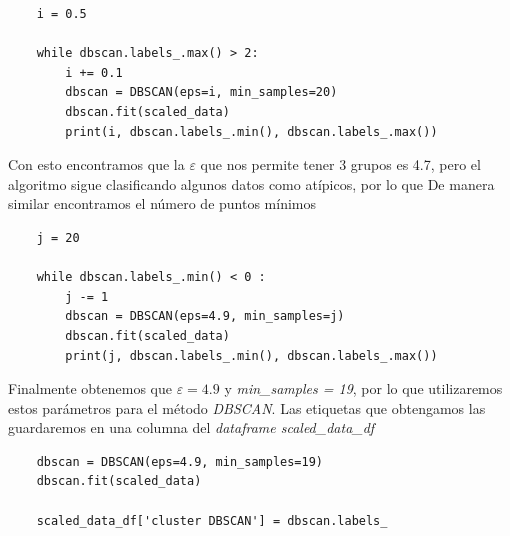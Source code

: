 \begin{lstlisting}
    i = 0.5
    
    while dbscan.labels_.max() > 2:
        i += 0.1
        dbscan = DBSCAN(eps=i, min_samples=20)
        dbscan.fit(scaled_data)
        print(i, dbscan.labels_.min(), dbscan.labels_.max())
\end{lstlisting}

Con esto encontramos que la $\varepsilon$ que nos permite tener 3 grupos es 4.7, pero el algoritmo sigue clasificando algunos datos como atípicos, por lo que De manera similar encontramos el número de puntos mínimos

\begin{lstlisting}
    j = 20
    
    while dbscan.labels_.min() < 0 :
        j -= 1
        dbscan = DBSCAN(eps=4.9, min_samples=j)
        dbscan.fit(scaled_data)
        print(j, dbscan.labels_.min(), dbscan.labels_.max())
\end{lstlisting}

Finalmente obtenemos que $\varepsilon  =4.9$ y \textit{min\_samples = 19}, por lo que utilizaremos estos parámetros para el método \textit{DBSCAN}. Las etiquetas que obtengamos las guardaremos en una columna del \textit{dataframe scaled\_data\_df}

\begin{lstlisting}
    dbscan = DBSCAN(eps=4.9, min_samples=19)
    dbscan.fit(scaled_data)

    scaled_data_df['cluster DBSCAN'] = dbscan.labels_
\end{lstlisting}